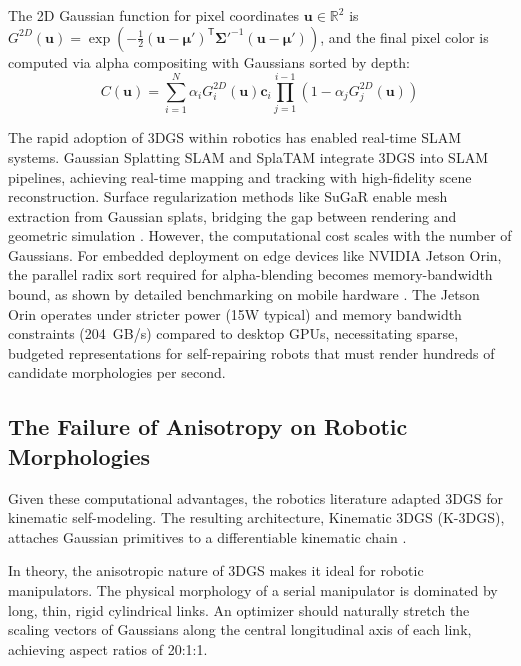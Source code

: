 \documentclass[12pt,a4paper,oneside]{report}
\begin{document}
The 2D Gaussian function for pixel coordinates $\mathbf{u} \in \mathbb{R}^2$ is $G^{2D}(\mathbf{u}) = \exp\left(-\frac{1}{2} (\mathbf{u} - \boldsymbol{\mu}')^\mathsf{T} \boldsymbol{\Sigma}'^{-1} (\mathbf{u} - \boldsymbol{\mu}')\right)$, and the final pixel color is computed via alpha compositing with Gaussians sorted by depth:
\begin{equation}C(\mathbf{u}) = \sum_{i=1}^{N} \alpha_i G_i^{2D}(\mathbf{u}) \mathbf{c}_i \prod_{j=1}^{i-1} (1 - \alpha_j G_j^{2D}(\mathbf{u}))
\end{equation}

The rapid adoption of 3DGS within robotics has enabled real-time SLAM systems. Gaussian Splatting SLAM \cite{matsuki2024gaussian} and SplaTAM \cite{keetha2024splattam} integrate 3DGS into SLAM pipelines, achieving real-time mapping and tracking with high-fidelity scene reconstruction. Surface regularization methods like SuGaR enable mesh extraction from Gaussian splats, bridging the gap between rendering and geometric simulation \cite{guedon2024sugar}. However, the computational cost scales with the number of Gaussians. For embedded deployment on edge devices like NVIDIA Jetson Orin, the parallel radix sort required for alpha-blending becomes memory-bandwidth bound, as shown by detailed benchmarking on mobile hardware \cite{lassanske2024gaurast}. The Jetson Orin operates under stricter power (15W typical) and memory bandwidth constraints (204~GB/s) compared to desktop GPUs, necessitating sparse, budgeted representations for self-repairing robots that must render hundreds of candidate morphologies per second.
\subsection{The Failure of Anisotropy on Robotic Morphologies}
\label{subsec:the_failure_of_anisotropy_on_robotic_morphologies}

Given these computational advantages, the robotics literature adapted 3DGS for kinematic self-modeling. The resulting architecture, Kinematic 3DGS (K-3DGS), attaches Gaussian primitives to a differentiable kinematic chain \cite{hu2025learning}.

In theory, the anisotropic nature of 3DGS makes it ideal for robotic manipulators. The physical morphology of a serial manipulator is dominated by long, thin, rigid cylindrical links. An optimizer should naturally stretch the scaling vectors of Gaussians along the central longitudinal axis of each link, achieving aspect ratios of 20:1:1.
\end{document}

